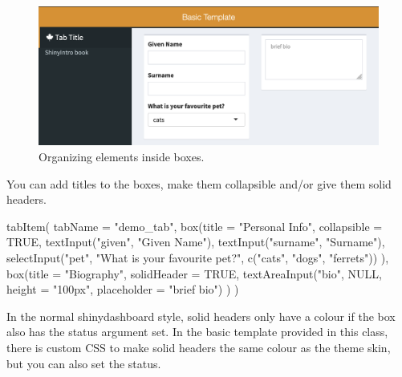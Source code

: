 \documentclass[
  oneside]{book}
\newenvironment{Shaded}{\begin{snugshade}}{\end{snugshade}}
\newcommand{\AttributeTok}[1]{\textcolor[rgb]{0.77,0.63,0.00}{#1}}
\newcommand{\ConstantTok}[1]{\textcolor[rgb]{0.00,0.00,0.00}{#1}}
\newcommand{\FunctionTok}[1]{\textcolor[rgb]{0.00,0.00,0.00}{#1}}
\newcommand{\NormalTok}[1]{#1}
\newcommand{\StringTok}[1]{\textcolor[rgb]{0.31,0.60,0.02}{#1}}
\begin{document}
\begin{figure}

{\centering \includegraphics[width=1\linewidth]{images/sdb_layout2} 

}

\caption{Organizing elements inside boxes.}\label{fig:sdb-layout2}
\end{figure}

You can add titles to the boxes, make them collapsible and/or give them solid headers.

\begin{Shaded}
\begin{Highlighting}[]
\FunctionTok{tabItem}\NormalTok{(}
    \AttributeTok{tabName =} \StringTok{"demo\_tab"}\NormalTok{,}
    \FunctionTok{box}\NormalTok{(}\AttributeTok{title =} \StringTok{"Personal Info"}\NormalTok{,}
        \AttributeTok{collapsible =} \ConstantTok{TRUE}\NormalTok{, }
        \FunctionTok{textInput}\NormalTok{(}\StringTok{"given"}\NormalTok{, }\StringTok{"Given Name"}\NormalTok{),}
        \FunctionTok{textInput}\NormalTok{(}\StringTok{"surname"}\NormalTok{, }\StringTok{"Surname"}\NormalTok{),}
        \FunctionTok{selectInput}\NormalTok{(}\StringTok{"pet"}\NormalTok{, }\StringTok{"What is your favourite pet?"}\NormalTok{, }\FunctionTok{c}\NormalTok{(}\StringTok{"cats"}\NormalTok{, }\StringTok{"dogs"}\NormalTok{, }\StringTok{"ferrets"}\NormalTok{))}
\NormalTok{    ),}
    \FunctionTok{box}\NormalTok{(}\AttributeTok{title =} \StringTok{"Biography"}\NormalTok{,}
        \AttributeTok{solidHeader =} \ConstantTok{TRUE}\NormalTok{, }
        \FunctionTok{textAreaInput}\NormalTok{(}\StringTok{"bio"}\NormalTok{, }\ConstantTok{NULL}\NormalTok{, }\AttributeTok{height =} \StringTok{"100px"}\NormalTok{, }\AttributeTok{placeholder =} \StringTok{"brief bio"}\NormalTok{)}
\NormalTok{    )}
\NormalTok{)}
\end{Highlighting}
\end{Shaded}

In the normal shinydashboard style, solid headers only have a colour if the box also has the status argument set. In the basic template provided in this class, there is custom CSS to make solid headers the same colour as the theme skin, but you can also set the \AttributeTok{status}.
\end{document}
